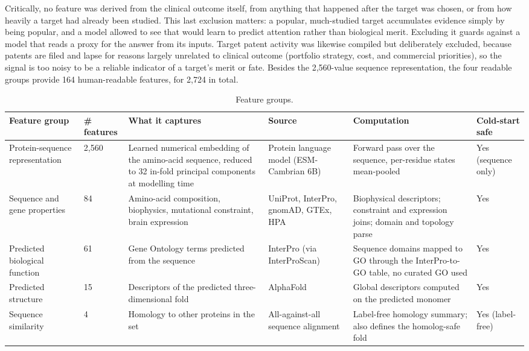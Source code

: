 \documentclass[11pt,twocolumn]{article}
\begin{document}
Critically, no feature was derived from the clinical outcome itself, from anything that happened after the target was chosen, or from how heavily a target had already been studied. This last exclusion matters: a popular, much-studied target accumulates evidence simply by being popular, and a model allowed to see that would learn to predict attention rather than biological merit. Excluding it guards against a model that reads a proxy for the answer from its inputs. Target patent activity was likewise compiled but deliberately excluded, because patents are filed and lapse for reasons largely unrelated to clinical outcome (portfolio strategy, cost, and commercial priorities), so the signal is too noisy to be a reliable indicator of a target's merit or fate. Besides the 2,560-value sequence representation, the four readable groups provide 164 human-readable features, for 2,724 in total.

\begin{table}[t]
\centering
\caption{Feature groups.}
\label{tab:4}
\footnotesize
\begin{tabular}{p{}p{}p{}p{}p{}p{}}
\toprule
Feature group & \# features & What it captures & Source & Computation & Cold-start safe \\
\midrule
Protein-sequence representation & 2,560 & Learned numerical embedding of the amino-acid sequence, reduced to 32 in-fold principal components at modelling time & Protein language model (ESM-Cambrian 6B)\cite{ref43,ref44} & Forward pass over the sequence, per-residue states mean-pooled & Yes (sequence only) \\
Sequence and gene properties & 84 & Amino-acid composition, biophysics, mutational constraint, brain expression & UniProt,\cite{ref45} InterPro,\cite{ref50} gnomAD,\cite{ref46} GTEx,\cite{ref47} HPA\cite{ref48} & Biophysical descriptors; constraint and expression joins; domain and topology parse & Yes \\
Predicted biological function & 61 & Gene Ontology terms predicted from the sequence & InterPro (via InterProScan)\cite{ref49,ref50} & Sequence domains mapped to GO through the InterPro-to-GO table,\cite{ref51} no curated GO used & Yes \\
Predicted structure & 15 & Descriptors of the predicted three-dimensional fold & AlphaFold\cite{ref52} & Global descriptors computed on the predicted monomer & Yes \\
Sequence similarity & 4 & Homology to other proteins in the set & All-against-all sequence alignment\cite{ref53} & Label-free homology summary; also defines the homolog-safe fold & Yes (label-free) \\
\bottomrule
\end{tabular}
\end{table}
\end{document}
